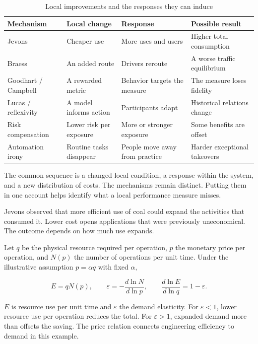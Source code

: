 \begin{table}[ht]
\centering
\caption{Local improvements and the responses they can induce}
\label{tab:ch1-paradox}
{\small
\begin{tabularx}{\textwidth}{@{}p{2.25cm}XXX@{}}
\toprule
Mechanism & Local change & Response & Possible result\\
\midrule
Jevons & Cheaper use & More uses and users & Higher total consumption\\
Braess & An added route & Drivers reroute & A worse traffic equilibrium\\
Goodhart / Campbell & A rewarded metric & Behavior targets the measure & The measure loses fidelity\\
Lucas / reflexivity & A model informs action & Participants adapt & Historical relations change\\
Risk compensation & Lower risk per exposure & More or stronger exposure & Some benefits are offset\\
Automation irony & Routine tasks disappear & People move away from practice & Harder exceptional takeovers\\
\bottomrule
\end{tabularx}}
\end{table}

The common sequence is a changed local condition, a response within the system, and a new distribution of costs. The mechanisms remain distinct. Putting them in one account helps identify what a local performance measure misses.


Jevons observed that more efficient use of coal could expand the activities that consumed it.\cite{jevons1865coal,allwood2012sustainable} Lower cost opens applications that were previously uneconomical. The outcome depends on how much use expands.

Let $q$ be the physical resource required per operation, $p$ the monetary price per operation, and $N(p)$ the number of operations per unit time. Under the illustrative assumption $p=\alpha q$ with fixed $\alpha$,

\begin{equation}
E=qN(p),
\qquad
\varepsilon=-\frac{d\ln N}{d\ln p},
\qquad
\frac{d\ln E}{d\ln q}=1-\varepsilon.
\end{equation}

$E$ is resource use per unit time and $\varepsilon$ the demand elasticity. For $\varepsilon<1$, lower resource use per operation reduces the total. For $\varepsilon>1$, expanded demand more than offsets the saving. The price relation connects engineering efficiency to demand in this example.

